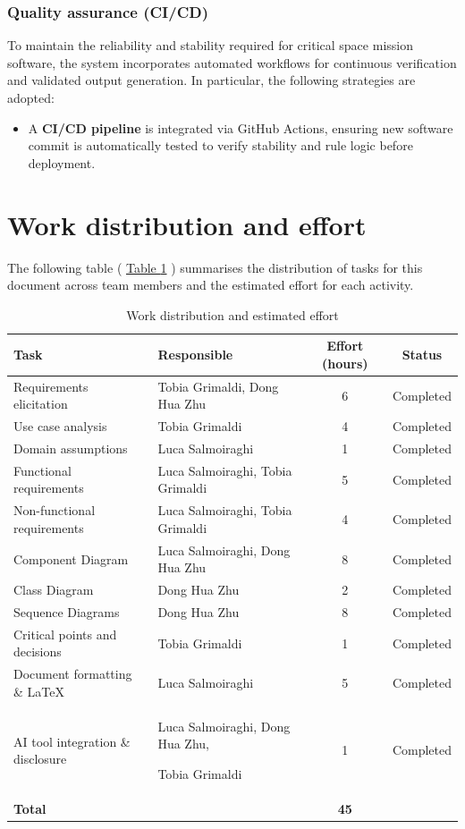 \documentclass{article}
\newcommand{\tablerefer}[1]{%
    \hyperref[#1_top]{Table \ref*{#1}}%
}
\begin{document}
\subsubsection{Quality assurance (CI/CD)}
To maintain the reliability and stability required for critical space mission software, the system incorporates automated workflows for continuous verification and validated output generation. In particular, the following strategies are adopted: 
\begin{itemize}
    \item A \textbf{CI/CD pipeline} is integrated via GitHub Actions, ensuring new software commit is automatically tested to verify stability and rule logic before deployment.

\end{itemize}

\clearpage
\section{Work distribution and effort}
The following table (\tablerefer{tab:work_distribution}) summarises the distribution of tasks for this document across team members and the estimated effort for each activity.
\begin{table}[h]
\label{tab:work_distribution_top}
\centering
\begin{tabularx}{\textwidth}{|X|X|c|c|}
\hline
\textbf{Task} & \textbf{Responsible} & \textbf{Effort (hours)} & \textbf{Status} \\
\hline
Requirements elicitation & Tobia Grimaldi, Dong Hua Zhu & 6 & Completed \\
\hline
Use case analysis & Tobia Grimaldi & 4 & Completed \\
\hline
Domain assumptions & Luca Salmoiraghi & 1 & Completed \\
\hline
Functional requirements & Luca Salmoiraghi, Tobia Grimaldi & 5 & Completed \\
\hline
Non-functional requirements & Luca Salmoiraghi, Tobia Grimaldi & 4 & Completed \\
\hline
Component Diagram & Luca Salmoiraghi, Dong Hua Zhu & 8 & Completed \\
\hline
Class Diagram & Dong Hua Zhu & 2 & Completed \\
\hline
Sequence Diagrams & Dong Hua Zhu & 8 & Completed \\
\hline
Critical points and decisions & Tobia Grimaldi & 1 & Completed \\
\hline
Document formatting \& LaTeX & Luca Salmoiraghi & 5 & Completed \\
\hline
AI tool integration \& disclosure & Luca Salmoiraghi, Dong Hua Zhu, \par Tobia Grimaldi & 1 & Completed \\
\hline
\textbf{Total} & & \textbf{45} & \\
\hline
\end{tabularx}
\caption{Work distribution and estimated effort}
\label{tab:work_distribution}
\end{table}
\end{document}
